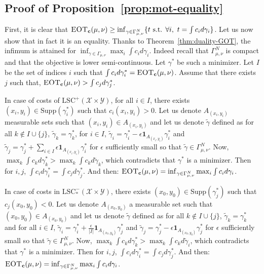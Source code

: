 \subsection{Proof of Proposition~\ref{prop:mot-equality}}
\label{prv:mot-equality}
\begin{prv*}

First, it is clear that $\textsc{EOT}_{\mathbf{c}}(\mu,\nu) \geq  \inf_{\gamma\in\Gamma^N_{\mu,\nu}}\{t\text{ s.t. }\forall i,~t=\int c_id\gamma_i\}$. Let us now show that in fact it is an equality. Thanks to Theorem~\ref{thm:duality-GOT}, the infimum is attained for $\inf_{\gamma\in\Gamma_{\mu,\nu}}\max_i\int c_id\gamma_i$. Indeed recall that $\Gamma^N_{\mu,\nu}$ is compact and that the objective is lower semi-continuous. Let $\gamma^*$ be such a minimizer. Let $I$ be the set of indices $i$ such that $\int c_id\gamma^*_i=\textsc{EOT}_{\mathbf{c}}(\mu,\nu)$. Assume that there exists $j$ such that, $\textsc{EOT}_{\mathbf{c}}(\mu,\nu)>\int c_jd\gamma^*_j$. 

In case of costs of $\mathrm{LSC}^+(\mathcal{X}\times\mathcal{Y})$, for all $i\in I$, there exists $(x_i,y_i)\in \text{Supp}(\gamma^*_i)$ such that $c_i(x_i,y_i)>0$. Let us denote $A_{(x_i,y_i)}$ measurable sets such that $(x_i,y_i)\in A_{(x_i,y_i)}$ and let us denote $\tilde{\gamma}$ defined as for all $k\notin I\cup\{j\}$, $\tilde{\gamma}_k = \gamma_k^*$, for $i\in I$, $\tilde{\gamma}_i = \gamma^*_i-\epsilon \mathbf{1}_{A_{(x_i,y_i)}}\gamma^*_i$ and $\tilde{\gamma}_j = \gamma^*_j+\sum_{i\in I}\epsilon \mathbf{1}_{A_{(x_i,y_i)}}\gamma^*_i$ for $\epsilon$ sufficiently small so that $\tilde{\gamma}\in\Gamma^N_{\mu,\nu}$. Now, $\max_k \int c_k d\gamma^*_k>\max_k \int c_k d\tilde{\gamma}_k$, which contradicts that $\gamma^*$ is a minimizer. Then for $i,j$, $\int c_id\gamma^*_i=\int c_jd\gamma^*_j$. And then:
$\textsc{EOT}_{\mathbf{c}}(\mu,\nu) = \inf_{\gamma\in\Gamma^N_{\mu,\nu}}\max_i\int c_id\gamma_i$.


In case of costs in $\mathrm{LSC}^-_{*}(\mathcal{X}\times\mathcal{Y})$, there exists $(x_0,y_0)\in \text{Supp}(\gamma^*_j)$ such that $c_j(x_0,y_0)<0$. Let us denote $A_{(x_0,y_0)}$ a measurable set such that $(x_0,y_0)\in A_{(x_0,y_0)}$ and let us denote $\tilde{\gamma}$ defined as for all $k\notin I\cup\{j\}$, $\tilde{\gamma}_k = \gamma_k^*$ and for all $i\in I$, $\tilde{\gamma}_i = \gamma^*_i+\frac{\epsilon}{\lvert I\rvert} \mathbf{1}_{A_{(x_0,y_0)}}\gamma^*_j$ and $\tilde{\gamma}_j = \gamma^*_j-\epsilon\mathbf{1}_{A_{(x_0,y_0)}}\gamma^*_j$ for $\epsilon$ sufficiently small so that $\tilde{\gamma}\in\Gamma^N_{\mu,\nu}$. Now, $\max_k \int c_k d\gamma^*_k>\max_k \int c_k d\tilde{\gamma}_i$, which contradicts that $\gamma^*$ is a minimizer. Then for $i,j$, $\int c_id\gamma^*_i=\int c_jd\gamma^*_j$. And then:
$\textsc{EOT}_{\mathbf{c}}(\mu,\nu) = \inf_{\gamma\in\Gamma^N_{\mu,\nu}}\max_i\int c_id\gamma_i$.


\end{prv*}
